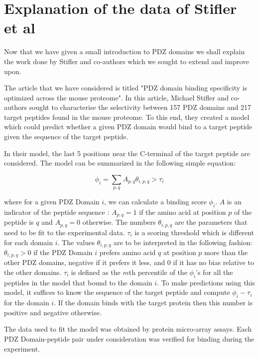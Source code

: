 \documentclass[a4paper, 12pt]{article}
\begin{document}
	\section{Explanation of the data of Stifler et al}

	Now that we have given a small introduction to PDZ domains we shall explain the work done by Stifler and co-authors which we sought to extend and improve upon.

	The article that we have considered is titled "PDZ domain binding specificity is optimized across the mouse proteome". In this article, Michael Stifler and co-authors sought to characterise the selectivity between 157 PDZ domains and 217 target peptides found in the mouse proteome. To this end, they created a model which could predict whether a given PDZ domain would bind to a target peptide given the sequence of the target peptide.

	In their model, the last 5 positions near the C-terminal of the target peptide are considered. The model can be summarized in the following simple equation: 

	\begin{equation}
	\phi_{i} = \sum_{p,q} A_{p,q} \theta_{i,p,q} > \tau_{i}
	\end{equation}

	where for a given PDZ Domain $i$, we can calculate a binding score $\phi_{i}$. $A$ is an indicator of the peptide sequence : $A_{p,q} =1$ if the amino acid at position $p$ of the peptide is $q$ and $A_{p,q} =0$ otherwise. The numbers $\theta_{i,p,q}$ are the parameters that need to be fit to the experimental data. $\tau_{i}$ is a scoring threshold which is different for each domain $i$. The values $\theta_{i,p,q}$ are to be interpreted in the following fashion: $\theta_{i,p,q} > 0$ if the PDZ Domain $i$ prefers amino acid $q$ at position $p$ more than the other PDZ domains, negative if it prefers it less, and 0 if it has no bias relative to the other domains. $\tau_{i}$ is defined as the $m$th percentile of the $\phi_{i}$'s for all the peptides in the model that bound to the domain $i$. To make predictions using this model, it suffices to know the sequence of the target peptide and compute $\phi_{i} - \tau_{i}$ for the domain $i$. If the domain binds with the target protein then this number is positive and negative otherwise. 

	The data used to fit the model was obtained by protein micro-array assays. Each PDZ Domain-peptide pair under consideration was verified for binding during the experiment. 
\end{document}
